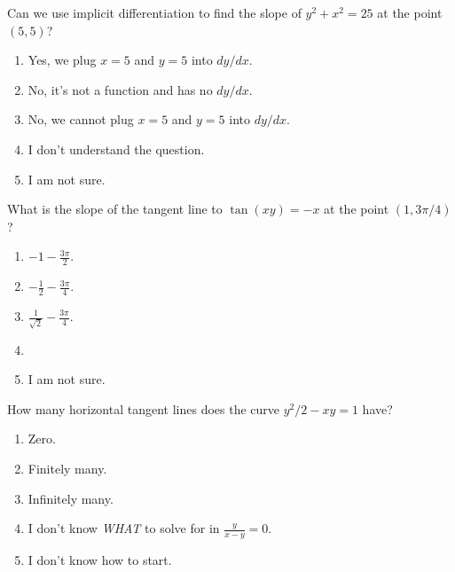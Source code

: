 \documentclass[14pt]{beamer}
\begin{document}
\begin{frame}
  Can we use implicit differentiation to find the slope of \(y^{2} + x^{2} = 25\) at the point \((5,5)\)?

  \medskip
  \begin{enumerate} 
    \item Yes, we plug \(x = 5\) and \(y = 5\) into \(dy/dx\).
    \item No, it's not a function and has no \(dy/dx\).
    \item No, we cannot plug \(x = 5\) and \(y = 5\) into \(dy/dx\).
    \item I don't understand the question.
    \item I am not sure.
  \end{enumerate} 
\end{frame}

\begin{frame}
  What is the slope of the tangent line to \(\tan(xy) = -x\) at the point \((1, 3\pi/4)\)?

  \medskip
  \begin{enumerate} 
    \item \(-1 - \frac{3\pi}{2}\). 
    \item \(-\frac{1}{2} - \frac{3\pi}{4}\). 
    \item \(\frac{1}{\sqrt{2}} - \frac{3\pi}{4}\). 
    \item 
    \item I am not sure.
  \end{enumerate} 
\end{frame}


\begin{frame}
  How many horizontal tangent lines does the curve \(y^{2}/2 - xy = 1\) have? 

  \medskip
  \begin{enumerate} 
    \item Zero.
    \item Finitely many.
    \item Infinitely many.
    \item I don't know \emph{WHAT} to solve for in \(\tfrac{y}{x - y} = 0\).
    \item I don't know how to start.
  \end{enumerate} 
\end{frame}
\end{document}
